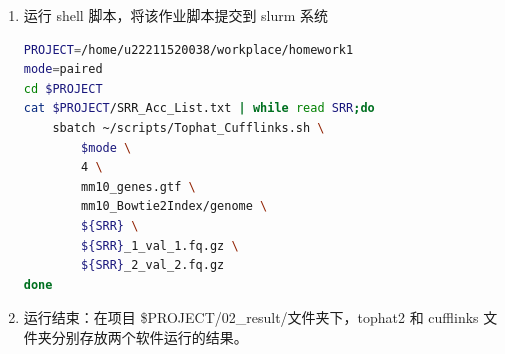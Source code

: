 \documentclass[
  a4paper,
]{article}
\begin{document}
\begin{enumerate}
\begin{lstlisting}[language=bash]
Annotation=$3
if test -z $Annotation
then
   echo "please input transcriptome-index(/share/Genomes/Homo_sapiens/UCSC/hg19/Annotation/Genes/hg19_genes/genes.gff)" 
   exit
fi

bowtie2Index=$4
if test -z $bowtie2Index
then
   echo "please input bowtie2-index(/share/Genomes/Homo_sapiens/UCSC/hg19/Sequence/Bowtie2Index/genome)" 
   exit
fi

SRR=$5
if test -z $SRR
then
   echo "please input SRR id"
   exit
fi

fq1=$6
if test -z $fq1
then
   echo "please input fasta1"
   exit
fi


if [ "$mode" == "paired" ];then

   fq2=$7
   if test -z $fq2
   then
      echo "please input fasta1"
      exit
   fi
fi

#====================================================
echo "Running info"
echo "Project:    "$PWD
echo "Read:       "$SRR
echo "Annotation: "$Annotation
echo "Genome:     "$bowtie2Index
echo " "

########################RUN##############################
mkdir -p ${RESULT}/tophat2/${SRR}
mkdir -p ${RESULT}/cufflinks/${SRR}

if [ "$mode" == "single" ];then
    # 如果是单端
    tophat2 -p ${threads} -o ${RESULT}/tophat2/${SRR} ${INDEX}/${bowtie2Index} ${DATA}/${fq1}
elif [ "$mode" == "paired" ];then
    # 如果是多端
    tophat2 -p ${threads} -o ${RESULT}/tophat2/${SRR} ${INDEX}/${bowtie2Index} ${DATA}/${fq1} ${DATA}/${fq2}
fi

cufflinks -p ${threads} -o ${RESULT}/cufflinks/${SRR} -G ${INDEX}/$Annotation ${RESULT}/tophat2/${SRR}/accepted_hits.bam

echo " "
echo " Running ${SRR} is compeleted."
echo " "
\end{lstlisting}
\item
  运行 shell 脚本，将该作业脚本提交到 slurm 系统

\begin{lstlisting}[language=bash]
PROJECT=/home/u22211520038/workplace/homework1
mode=paired
cd $PROJECT
cat $PROJECT/SRR_Acc_List.txt | while read SRR;do
    sbatch ~/scripts/Tophat_Cufflinks.sh \
        $mode \
        4 \
        mm10_genes.gtf \
        mm10_Bowtie2Index/genome \
        ${SRR} \
        ${SRR}_1_val_1.fq.gz \
        ${SRR}_2_val_2.fq.gz 
done
\end{lstlisting}
\item
  运行结束：在项目 \$PROJECT/02\_result/文件夹下，tophat2 和 cufflinks
  文件夹分别存放两个软件运行的结果。


\end{enumerate}
\end{document}
